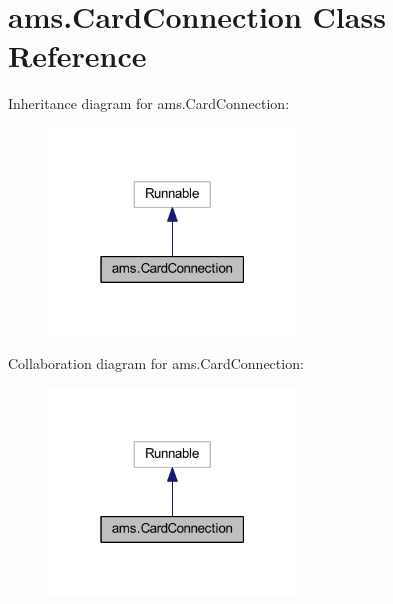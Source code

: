 \hypertarget{classams_1_1_card_connection}{}\section{ams.\+Card\+Connection Class Reference}
\label{classams_1_1_card_connection}


Inheritance diagram for ams.\+Card\+Connection\+:\nopagebreak
\begin{figure}[H]
\begin{center}
\leavevmode
\includegraphics[width=187pt]{classams_1_1_card_connection__inherit__graph}
\end{center}
\end{figure}


Collaboration diagram for ams.\+Card\+Connection\+:\nopagebreak
\begin{figure}[H]
\begin{center}
\leavevmode
\includegraphics[width=187pt]{classams_1_1_card_connection__coll__graph}
\end{center}
\end{figure}
